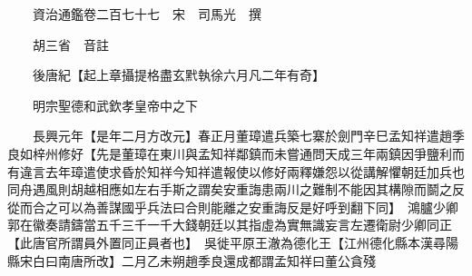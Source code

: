 










 


 
 


 

  
  
  
  
  





  
  
  
  
  
 
  

  

  
  
  



  

 
 

  
   




  

  
  


  　　資治通鑑卷二百七十七　宋　司馬光　撰

　　胡三省　音註

　　後唐紀【起上章攝提格盡玄黓執徐六月凡二年有奇】

　　明宗聖德和武欽孝皇帝中之下

　　長興元年【是年二月方改元】春正月董璋遣兵築七寨於劍門辛巳孟知祥遣趙季良如梓州修好【先是董璋在東川與孟知祥鄰鎮而未嘗通問天成三年兩鎮因爭鹽利而有違言去年璋遣使求昏於知祥今知祥遣報使以修好兩釋嫌怨以從講解懼朝廷加兵也同舟遇風則胡越相應如左右手斯之謂矣安重誨患兩川之難制不能因其構隙而鬬之反從而合之可以為善謀國乎兵法曰合則能離之安重誨反是好呼到翻下同】　鴻臚少卿郭在徽奏請鑄當五千三千一千大錢朝廷以其指虛為實無識妄言左遷衛尉少卿同正【此唐官所謂員外置同正員者也】　吳徙平原王澈為德化王【江州德化縣本漢尋陽縣宋白曰南唐所改】二月乙未朔趙季良還成都謂孟知祥曰董公貪殘


